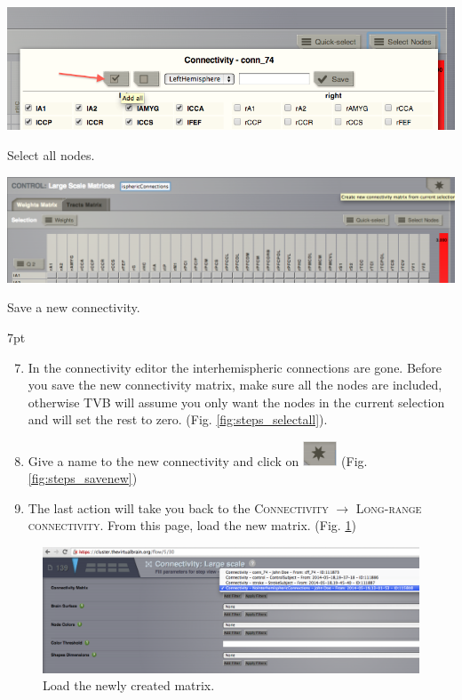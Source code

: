 \documentclass{tufte-handout}
\newenvironment{formal}{%
  \def\FrameCommand{%
    \hspace{1pt}%
    {\color{DarkBlue}\vrule width 2pt}%
    {\color{formalshade}\vrule width 4pt}%
    \colorbox{formalshade}%
  }%
  \MakeFramed{\advance\hsize-\width\FrameRestore}%
  \noindent\hspace{-4.55pt}%
  \begin{adjustwidth}{}{7pt}%
  \vspace{2pt}\vspace{2pt}%
}
{%
  \vspace{2pt}\end{adjustwidth}\endMakeFramed%
}
\begin{document}
\begin{marginfigure}%
  \includegraphics[width=\linewidth]{Handout_UI_ModellingStructuralLesions_SelectAllNodes}
    \caption{Select all nodes.}
  \label{fig:steps_selectall}
  \end{marginfigure}
  \begin{marginfigure}
 \includegraphics[width=\linewidth]{Handout_UI_ModellingStructuralLesions_SaveNewMatrix}
  \caption{Save a new connectivity.}
  \label{fig:steps_savenew}
\end{marginfigure}

\begin{formal}
  \begin{enumerate}[resume]
  \setcounter{enumi}{6}
    \item In the connectivity editor the interhemispheric connections are gone.
    Before you save the new connectivity matrix, make sure all the nodes are
included, otherwise TVB will assume you only want the nodes in the current
selection and will set the rest to zero. (Fig. \ref{fig:steps_selectall}).
   \item Give a name to the new connectivity and click on \includegraphics[width=0.08\textwidth]{butt_star_create.png} (Fig. \ref{fig:steps_savenew})
    \item The last action will take you back to the \textsc{Connectivity} $\rightarrow$ \textsc{Long-range connectivity}. From this page, load the new matrix. (Fig. \ref{fig:steps_07})
  \end{enumerate}
\end{formal}


\begin{figure}[h]
  \includegraphics[width=\linewidth]{Handout_UI_ModellingStructuralLesions_LoadNewMatrix}%
  \caption{Load the newly created matrix.}%
  \label{fig:steps_07}%
\end{figure}
\end{document}
